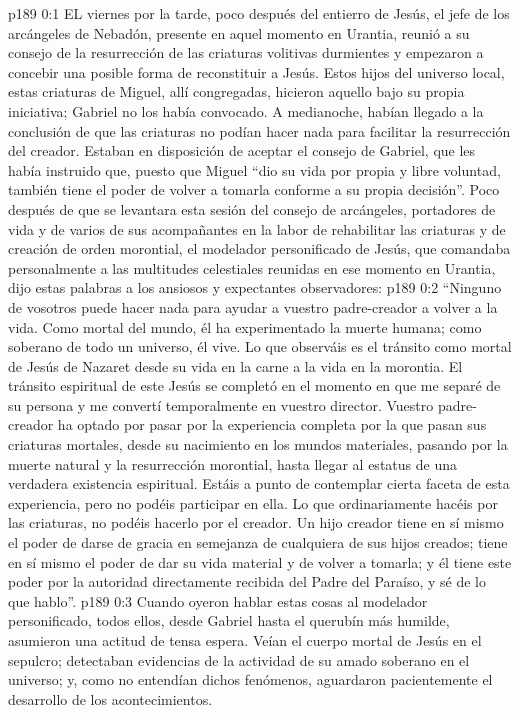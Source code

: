 \author{Comisión de seres intermedios}
\vs p189 0:1 EL viernes por la tarde, poco después del entierro de Jesús, el jefe de los arcángeles de Nebadón, presente en aquel momento en Urantia, reunió a su consejo de la resurrección de las criaturas volitivas durmientes y empezaron a concebir una posible forma de reconstituir a Jesús. Estos hijos del universo local, estas criaturas de Miguel, allí congregadas, hicieron aquello bajo su propia iniciativa; Gabriel no los había convocado. A medianoche, habían llegado a la conclusión de que las criaturas no podían hacer nada para facilitar la resurrección del creador. Estaban en disposición de aceptar el consejo de Gabriel, que les había instruido que, puesto que Miguel “dio su vida por propia y libre voluntad, también tiene el poder de volver a tomarla conforme a su propia decisión”. Poco después de que se levantara esta sesión del consejo de arcángeles, portadores de vida y de varios de sus acompañantes en la labor de rehabilitar las criaturas y de creación de orden morontial, el modelador personificado de Jesús, que comandaba personalmente a las multitudes celestiales reunidas en ese momento en Urantia, dijo estas palabras a los ansiosos y expectantes observadores:
\vs p189 0:2 “Ninguno de vosotros puede hacer nada para ayudar a vuestro padre\hyp{}creador a volver a la vida. Como mortal del mundo, él ha experimentado la muerte humana; como soberano de todo un universo, él vive. Lo que observáis es el tránsito como mortal de Jesús de Nazaret desde su vida en la carne a la vida en la morontia. El tránsito espiritual de este Jesús se completó en el momento en que me separé de su persona y me convertí temporalmente en vuestro director. Vuestro padre\hyp{}creador ha optado por pasar por la experiencia completa por la que pasan sus criaturas mortales, desde su nacimiento en los mundos materiales, pasando por la muerte natural y la resurrección morontial, hasta llegar al estatus de una verdadera existencia espiritual. Estáis a punto de contemplar cierta faceta de esta experiencia, pero no podéis participar en ella. Lo que ordinariamente hacéis por las criaturas, no podéis hacerlo por el creador. Un hijo creador tiene en sí mismo el poder de darse de gracia en semejanza de cualquiera de sus hijos creados; tiene en sí mismo el poder de dar su vida material y de volver a tomarla; y él tiene este poder por la autoridad directamente recibida del Padre del Paraíso, y sé de lo que hablo”.
\vs p189 0:3 Cuando oyeron hablar estas cosas al modelador personificado, todos ellos, desde Gabriel hasta el querubín más humilde, asumieron una actitud de tensa espera. Veían el cuerpo mortal de Jesús en el sepulcro; detectaban evidencias de la actividad de su amado soberano en el universo; y, como no entendían dichos fenómenos, aguardaron pacientemente el desarrollo de los acontecimientos.
